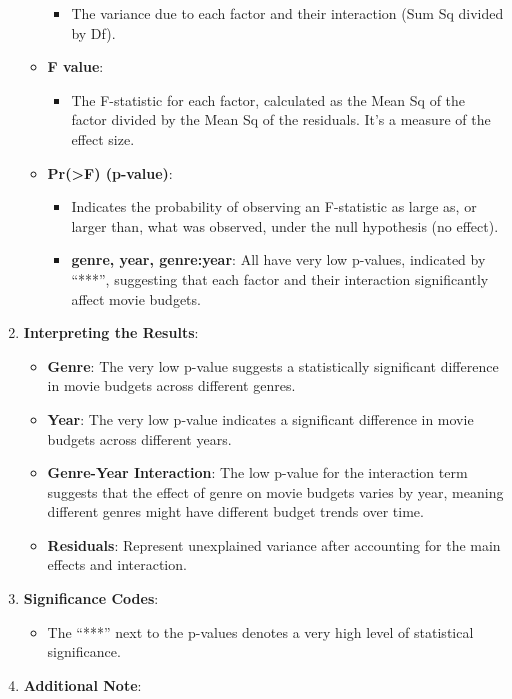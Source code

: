 \documentclass[
]{book}
\providecommand{\tightlist}{%
  \setlength{\itemsep}{0pt}\setlength{\parskip}{0pt}}
\begin{document}
\begin{enumerate}
\begin{itemize}
    \begin{itemize}
    \tightlist
    \item
      The variance due to each factor and their interaction (Sum Sq divided by Df).
    \end{itemize}
  \item
    \textbf{F value}:

    \begin{itemize}
    \tightlist
    \item
      The F-statistic for each factor, calculated as the Mean Sq of the factor divided by the Mean Sq of the residuals. It's a measure of the effect size.
    \end{itemize}
  \item
    \textbf{Pr(\textgreater F) (p-value)}:

    \begin{itemize}
    \tightlist
    \item
      Indicates the probability of observing an F-statistic as large as, or larger than, what was observed, under the null hypothesis (no effect).
    \item
      \textbf{genre, year, genre:year}: All have very low p-values, indicated by ``***'', suggesting that each factor and their interaction significantly affect movie budgets.
    \end{itemize}
  \end{itemize}
\item
  \textbf{Interpreting the Results}:

  \begin{itemize}
  \tightlist
  \item
    \textbf{Genre}: The very low p-value suggests a statistically significant difference in movie budgets across different genres.
  \item
    \textbf{Year}: The very low p-value indicates a significant difference in movie budgets across different years.
  \item
    \textbf{Genre-Year Interaction}: The low p-value for the interaction term suggests that the effect of genre on movie budgets varies by year, meaning different genres might have different budget trends over time.
  \item
    \textbf{Residuals}: Represent unexplained variance after accounting for the main effects and interaction.
  \end{itemize}
\item
  \textbf{Significance Codes}:

  \begin{itemize}
  \tightlist
  \item
    The ``***'' next to the p-values denotes a very high level of statistical significance.
  \end{itemize}
\item
  \textbf{Additional Note}:


\end{enumerate}
\end{document}
